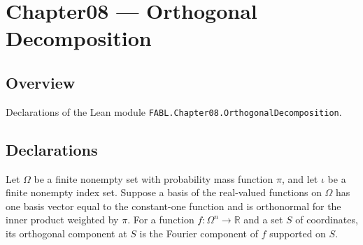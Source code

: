 \chapter{Chapter08 — Orthogonal Decomposition}
\section{Overview}

Declarations of the Lean module \texttt{FABL.Chapter08.OrthogonalDecomposition}.

\section{Declarations}

\begin{definition}
\label{FABL.FiniteFourierBasis.orthogonalComponent}
\leanok
{}
Let $\Omega$ be a finite nonempty set with probability mass function $\pi$, and let
$\iota$ be a finite nonempty index set. Suppose a basis of the real-valued functions on
$\Omega$ has one basis vector equal to the constant-one function and is orthonormal for
the inner product weighted by $\pi$. For a function $f\colon\Omega^n\to\mathbb{R}$ and a
set $S$ of coordinates, its orthogonal component at $S$ is the Fourier component of $f$
supported on $S$.
\end{definition}


